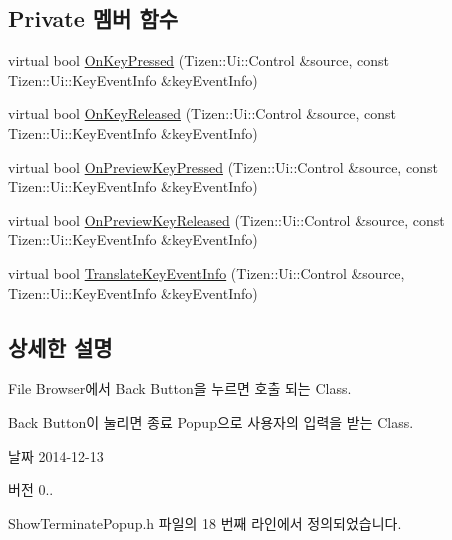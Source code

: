 \subsection*{Private 멤버 함수}
\begin{DoxyCompactItemize}
\item 
virtual bool \hyperlink{class_popup_event_listener_terminate_a56571001bc321b03f9f339a1f07a6183}{On\+Key\+Pressed} (Tizen\+::\+Ui\+::\+Control \&source, const Tizen\+::\+Ui\+::\+Key\+Event\+Info \&key\+Event\+Info)
\item 
virtual bool \hyperlink{class_popup_event_listener_terminate_ab6f60061fcccee597942535a536a2082}{On\+Key\+Released} (Tizen\+::\+Ui\+::\+Control \&source, const Tizen\+::\+Ui\+::\+Key\+Event\+Info \&key\+Event\+Info)
\item 
virtual bool \hyperlink{class_popup_event_listener_terminate_a1e453b448f6d4bd29ae144130f09d9f8}{On\+Preview\+Key\+Pressed} (Tizen\+::\+Ui\+::\+Control \&source, const Tizen\+::\+Ui\+::\+Key\+Event\+Info \&key\+Event\+Info)
\item 
virtual bool \hyperlink{class_popup_event_listener_terminate_a03448227e6a004f9ac16b34c977030f8}{On\+Preview\+Key\+Released} (Tizen\+::\+Ui\+::\+Control \&source, const Tizen\+::\+Ui\+::\+Key\+Event\+Info \&key\+Event\+Info)
\item 
virtual bool \hyperlink{class_popup_event_listener_terminate_ac72662a73d93a8d2011faf304bb5704d}{Translate\+Key\+Event\+Info} (Tizen\+::\+Ui\+::\+Control \&source, Tizen\+::\+Ui\+::\+Key\+Event\+Info \&key\+Event\+Info)
\end{DoxyCompactItemize}


\subsection{상세한 설명}
File Browser에서 Back Button을 누르면 호출 되는 Class. 

Back Button이 눌리면 종료 Popup으로 사용자의 입력을 받는 Class. \begin{DoxyDate}{날짜}
2014-\/12-\/13 
\end{DoxyDate}
\begin{DoxyVersion}{버전}
0.. 
\end{DoxyVersion}


Show\+Terminate\+Popup.\+h 파일의 18 번째 라인에서 정의되었습니다.



